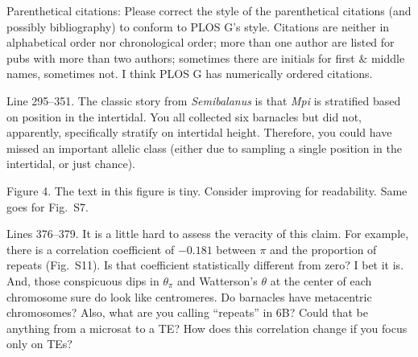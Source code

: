 
\begin{point}{} %
Parenthetical citations: Please correct the style of the parenthetical
citations (and possibly bibliography) to conform to PLOS G's style.
Citations are neither in alphabetical order nor chronological order;
more than one author are listed for pubs with more than two authors;
sometimes there are initials for first \& middle names, sometimes not. I
think PLOS G has numerically ordered citations.
\end{point}


\begin{point}{} %
Line 295--351. The classic story from \emph{Semibalanus} is that
\emph{Mpi} is stratified based on position in the intertidal. You all
collected six barnacles but did not, apparently, specifically stratify
on intertidal height. Therefore, you could have missed an important
allelic class (either due to sampling a single position in the
intertidal, or just chance).
\end{point}


\begin{point}{} %
Figure 4. The text in this figure is tiny. Consider improving for
readability. Same goes for Fig.\ S7.
\end{point}


\begin{point}{} %
Lines 376--379. It is a little hard to assess the veracity of this
claim. For example, there is a correlation coefficient of $-0.181$
between $\pi$ and the proportion of repeats (Fig.\ S11). Is that
coefficient statistically different from zero? I bet it is. And, those
conspicuous dips in $\theta_\pi$ and Watterson's $\theta$ at the center
of each chromosome sure do look like centromeres. Do barnacles have
metacentric chromosomes? Also, what are you calling ``repeats'' in 6B?
Could that be anything from a microsat to a TE? How does this
correlation change if you focus only on TEs?
\end{point}

